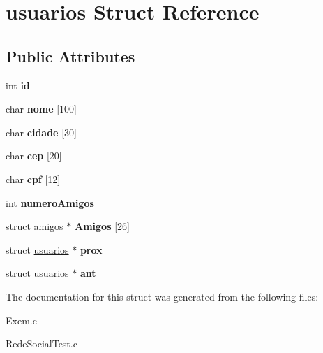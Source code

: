 \hypertarget{structusuarios}{}\section{usuarios Struct Reference}
\label{structusuarios}
\subsection*{Public Attributes}
\begin{DoxyCompactItemize}
\item 
\mbox{\label{structusuarios_ab69b925316f6d27b13e9ad7b940b3f9f}} 
int {\bfseries id}
\item 
\mbox{\label{structusuarios_a7dc4f26824ec436051fdc940042a929c}} 
char {\bfseries nome} \mbox{[}100\mbox{]}
\item 
\mbox{\label{structusuarios_a2b8e773b31ea2e4938ff62efb2a29a0d}} 
char {\bfseries cidade} \mbox{[}30\mbox{]}
\item 
\mbox{\label{structusuarios_ae27dbc6054333d39ebc5772d12418618}} 
char {\bfseries cep} \mbox{[}20\mbox{]}
\item 
\mbox{\label{structusuarios_a69a09014cf82259b574e82574e710879}} 
char {\bfseries cpf} \mbox{[}12\mbox{]}
\item 
\mbox{\label{structusuarios_a668fb8e90d9b55a98fe77067f5f4231b}} 
int {\bfseries numero\+Amigos}
\item 
\mbox{\label{structusuarios_a89c280370269e05ec68bb01e615712b3}} 
struct \hyperlink{structamigos}{amigos} $\ast$ {\bfseries Amigos} \mbox{[}26\mbox{]}
\item 
\mbox{\label{structusuarios_aef863a201f939397c7909a49d19e8e76}} 
struct \hyperlink{structusuarios}{usuarios} $\ast$ {\bfseries prox}
\item 
\mbox{\label{structusuarios_a048cd4f7843b3005bb05bfa9e2cd1dd2}} 
struct \hyperlink{structusuarios}{usuarios} $\ast$ {\bfseries ant}
\end{DoxyCompactItemize}


The documentation for this struct was generated from the following files\+:\begin{DoxyCompactItemize}
\item 
Exem.\+c\item 
Rede\+Social\+Test.\+c\end{DoxyCompactItemize}
